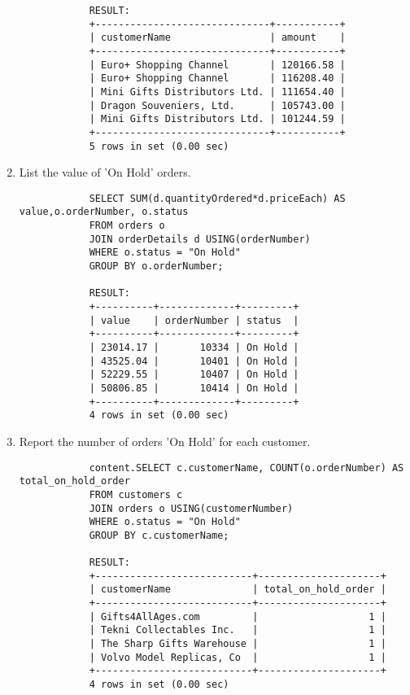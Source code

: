 \documentclass{article}
\begin{document}
\begin{enumerate}
\begin{verbatim}
			RESULT:
			+------------------------------+-----------+
			| customerName                 | amount    |
			+------------------------------+-----------+
			| Euro+ Shopping Channel       | 120166.58 |
			| Euro+ Shopping Channel       | 116208.40 |
			| Mini Gifts Distributors Ltd. | 111654.40 |
			| Dragon Souveniers, Ltd.      | 105743.00 |
			| Mini Gifts Distributors Ltd. | 101244.59 |
			+------------------------------+-----------+
			5 rows in set (0.00 sec)
			\end{verbatim}
		\item List the value of 'On Hold' orders.
			\begin{verbatim}
			SELECT SUM(d.quantityOrdered*d.priceEach) AS value,o.orderNumber, o.status
			FROM orders o
			JOIN orderDetails d USING(orderNumber)
			WHERE o.status = "On Hold"
			GROUP BY o.orderNumber;
			
			RESULT:
			+----------+-------------+---------+
			| value    | orderNumber | status  |
			+----------+-------------+---------+
			| 23014.17 |       10334 | On Hold |
			| 43525.04 |       10401 | On Hold |
			| 52229.55 |       10407 | On Hold |
			| 50806.85 |       10414 | On Hold |
			+----------+-------------+---------+
			4 rows in set (0.00 sec)
			\end{verbatim}
		\item Report the number of orders 'On Hold' for each customer.
			\begin{verbatim}
			content.SELECT c.customerName, COUNT(o.orderNumber) AS total_on_hold_order
			FROM customers c
			JOIN orders o USING(customerNumber)
			WHERE o.status = "On Hold"
			GROUP BY c.customerName;
			
			RESULT:
			+---------------------------+---------------------+
			| customerName              | total_on_hold_order |
			+---------------------------+---------------------+
			| Gifts4AllAges.com         |                   1 |
			| Tekni Collectables Inc.   |                   1 |
			| The Sharp Gifts Warehouse |                   1 |
			| Volvo Model Replicas, Co  |                   1 |
			+---------------------------+---------------------+
			4 rows in set (0.00 sec)
			\end{verbatim}
	\end{enumerate}
\end{document}
